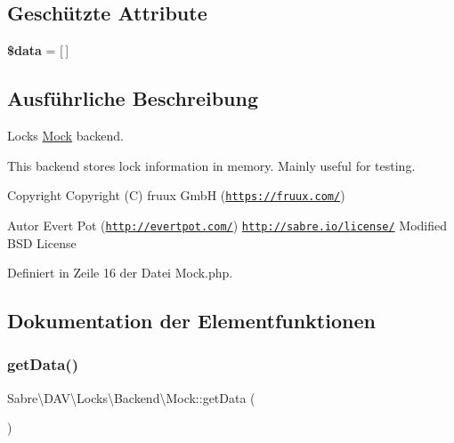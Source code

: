 \subsection*{Geschützte Attribute}
\begin{DoxyCompactItemize}
\item 
\mbox{\label{class_sabre_1_1_d_a_v_1_1_locks_1_1_backend_1_1_mock_a7e35caec8e825f8300d61e465af003c7}} 
{\bfseries \$data} = \mbox{[}$\,$\mbox{]}
\end{DoxyCompactItemize}


\subsection{Ausführliche Beschreibung}
Locks \mbox{\hyperlink{class_sabre_1_1_d_a_v_1_1_locks_1_1_backend_1_1_mock}{Mock}} backend.

This backend stores lock information in memory. Mainly useful for testing.

\begin{DoxyCopyright}{Copyright}
Copyright (C) fruux GmbH (\href{https://fruux.com/}{\tt https\+://fruux.\+com/}) 
\end{DoxyCopyright}
\begin{DoxyAuthor}{Autor}
Evert Pot (\href{http://evertpot.com/}{\tt http\+://evertpot.\+com/})  \href{http://sabre.io/license/}{\tt http\+://sabre.\+io/license/} Modified B\+SD License 
\end{DoxyAuthor}


Definiert in Zeile 16 der Datei Mock.\+php.



\subsection{Dokumentation der Elementfunktionen}
\mbox{\label{class_sabre_1_1_d_a_v_1_1_locks_1_1_backend_1_1_mock_ae64e58888c3b627080afbf3fc21f2e28}} 
\subsubsection{\texorpdfstring{get\+Data()}{getData()}}
{\footnotesize\ttfamily Sabre\textbackslash{}\+D\+A\+V\textbackslash{}\+Locks\textbackslash{}\+Backend\textbackslash{}\+Mock\+::get\+Data (\begin{DoxyParamCaption}{ }\end{DoxyParamCaption})\hspace{0.3cm}{\ttfamily [protected]}}

